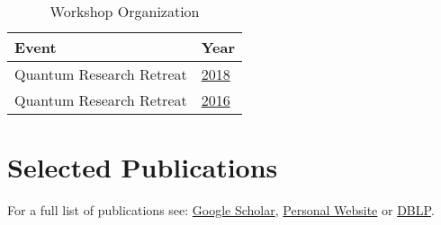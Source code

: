 \begin{table}[h]
    \centering
    \caption{Workshop Organization}
    \label{tab:quantum_research_retreat}
    \renewcommand{\arraystretch}{1.3}
    \setlength{\tabcolsep}{10pt}
    \begin{tabular}{|l|l|}
        \hline
        \textbf{Event} & \textbf{Year} \\
        \hline
        Quantum Research Retreat & \href{https://cryptme.in/events/qrr/2018/}{2018} \\
        Quantum Research Retreat & \href{https://cryptme.in/events/qrr/2016/}{2016} \\
        \hline
    \end{tabular}
\end{table}



\section*{Selected Publications}

For a full list of publications see: \href{https://scholar.google.com/citations?user=0AIDhMwAAAAJ&hl=fr}{Google Scholar}, 
\href{https://cryptme.in/#publications}{Personal Website} or \href{https://dblp.org/pid/150/9441.html}{DBLP}.

